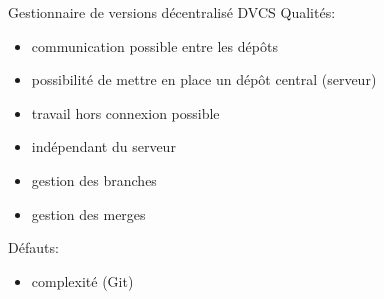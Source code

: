 \begin{frame}{Gestionnaire de versions décentralisé DVCS}
  Qualités:
  \begin{itemize}
    \item{communication possible entre les dépôts}
    \item{possibilité de mettre en place un dépôt central (serveur)}
    \item{travail hors connexion possible}
    \item{indépendant du serveur}
    \item{gestion des branches}
    \item{gestion des merges}
  \end{itemize}

  Défauts:
  \begin{itemize}
    \item{complexité (Git)}
  \end{itemize}
\end{frame}
